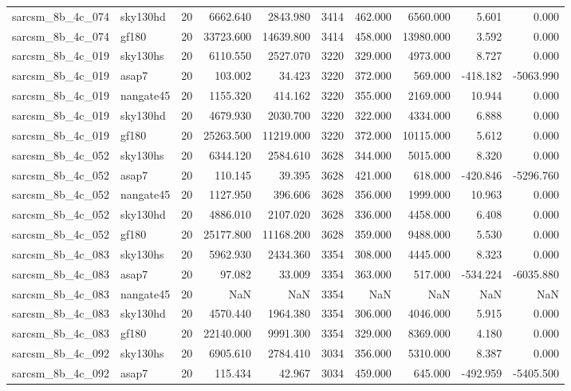 \begin{longtable}{llrrrrrrrr}
sarcsm\_8b\_4c\_074 & sky130hd & 20 & 6662.640 & 2843.980 & 3414 & 462.000 & 6560.000 & 5.601 & 0.000 \\
sarcsm\_8b\_4c\_074 & gf180 & 20 & 33723.600 & 14639.800 & 3414 & 458.000 & 13980.000 & 3.592 & 0.000 \\
sarcsm\_8b\_4c\_019 & sky130hs & 20 & 6110.550 & 2527.070 & 3220 & 329.000 & 4973.000 & 8.727 & 0.000 \\
sarcsm\_8b\_4c\_019 & asap7 & 20 & 103.002 & 34.423 & 3220 & 372.000 & 569.000 & -418.182 & -5063.990 \\
sarcsm\_8b\_4c\_019 & nangate45 & 20 & 1155.320 & 414.162 & 3220 & 355.000 & 2169.000 & 10.944 & 0.000 \\
sarcsm\_8b\_4c\_019 & sky130hd & 20 & 4679.930 & 2030.700 & 3220 & 322.000 & 4334.000 & 6.888 & 0.000 \\
sarcsm\_8b\_4c\_019 & gf180 & 20 & 25263.500 & 11219.000 & 3220 & 372.000 & 10115.000 & 5.612 & 0.000 \\
sarcsm\_8b\_4c\_052 & sky130hs & 20 & 6344.120 & 2584.610 & 3628 & 344.000 & 5015.000 & 8.320 & 0.000 \\
sarcsm\_8b\_4c\_052 & asap7 & 20 & 110.145 & 39.395 & 3628 & 421.000 & 618.000 & -420.846 & -5296.760 \\
sarcsm\_8b\_4c\_052 & nangate45 & 20 & 1127.950 & 396.606 & 3628 & 356.000 & 1999.000 & 10.963 & 0.000 \\
sarcsm\_8b\_4c\_052 & sky130hd & 20 & 4886.010 & 2107.020 & 3628 & 336.000 & 4458.000 & 6.408 & 0.000 \\
sarcsm\_8b\_4c\_052 & gf180 & 20 & 25177.800 & 11168.200 & 3628 & 359.000 & 9488.000 & 5.530 & 0.000 \\
sarcsm\_8b\_4c\_083 & sky130hs & 20 & 5962.930 & 2434.360 & 3354 & 308.000 & 4445.000 & 8.323 & 0.000 \\
sarcsm\_8b\_4c\_083 & asap7 & 20 & 97.082 & 33.009 & 3354 & 363.000 & 517.000 & -534.224 & -6035.880 \\
sarcsm\_8b\_4c\_083 & nangate45 & 20 & NaN & NaN & 3354 & NaN & NaN & NaN & NaN \\
sarcsm\_8b\_4c\_083 & sky130hd & 20 & 4570.440 & 1964.380 & 3354 & 306.000 & 4046.000 & 5.915 & 0.000 \\
sarcsm\_8b\_4c\_083 & gf180 & 20 & 22140.000 & 9991.300 & 3354 & 329.000 & 8369.000 & 4.180 & 0.000 \\
sarcsm\_8b\_4c\_092 & sky130hs & 20 & 6905.610 & 2784.410 & 3034 & 356.000 & 5310.000 & 8.387 & 0.000 \\
sarcsm\_8b\_4c\_092 & asap7 & 20 & 115.434 & 42.967 & 3034 & 459.000 & 645.000 & -492.959 & -5405.500 \\

\end{longtable}
